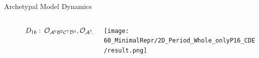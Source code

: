 \begin{frame}{Archetypal Model Dynamics}
{\begin{columns}
\begin{column}{.9 \textwidth}
\begin{figure}
{					}{$D_{16}:\:\mathcal{O}_{\mathcal{A}^6\mathcal{B}^2\mathcal{C}^7\mathcal{D}^3},\mathcal{O}_{\mathcal{A}^7\mathcal{B}^3\mathcal{C}^6\mathcal{D}^2}$}
				\end{figure}
			\end{column}
			\begin{column}{.2 \textwidth}
				\vspace{-4em}
				\begin{center}
					\hspace{-2em}
					\texttt{[image: 60\_MinimalRepr/2D\_Period\_Whole\_onlyP16\_CDE/result.png]}
				\end{center}
			\end{column}
		\end{columns}
	}
\end{frame}


